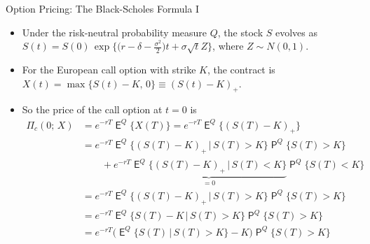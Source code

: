 \documentclass[10pt,handout]{beamer}
\DeclareMathOperator\prb{\mathsf{P}}
\DeclareMathOperator\expc{\mathsf{E}}
\theoremstyle{definition}
\begin{document}
\begin{frame}{Option Pricing: The Black-Scholes Formula I}
  \begin{itemize}
    \item Under the risk-neutral probability measure $Q$, the stock $S$ evolves as $S(t) = S(0)\,\exp\big\{\big(r - \delta - \frac{\sigma^2}{2}\big)t + \sigma\sqrt{t}Z\big\}$, where $Z\sim N(0, 1)$.
    \item For the European call option with strike $K$, the contract is $X(t) = \max\{S(t) - K,\,0\} \equiv (S(t) - K)_+$.
    \item So the price of the call option at $t = 0$ is
      \begin{align*}
        \Pi_c(0;\,X) &= e^{-rT}\expc^Q\{X(T)\} = e^{-rT}\expc^Q\{(S(T) - K)_+\} \\ 
        &= e^{-rT}\expc^Q\{(S(T) - K)_+\,|\, S(T) > K\} \prb^Q\{S(T) > K\} \\
        &\qquad+ e^{-rT}\underbrace{\expc^Q\{(S(T) - K)_+\,|\, S(T) < K\}}_{ = 0} \prb^Q\{S(T) < K\} \\
        &= e^{-rT}\expc^Q\{(S(T) - K)_+\,|\, S(T) > K\} \prb^Q\{S(T) > K\} \\
        &= e^{-rT}\expc^Q\{S(T) - K\,|\, S(T) > K\} \prb^Q\{S(T) > K\} \\ 
        &= e^{-rT}\big(\expc^Q\{S(T)\,|\, S(T) > K\} - K\big)\prb^Q\{S(T) > K\} 
      \end{align*}
  \end{itemize}
\end{frame}
\end{document}
